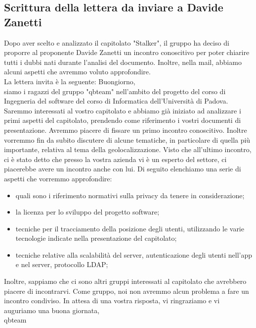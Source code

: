 \subsection{Scrittura della lettera da inviare a Davide Zanetti}
Dopo aver scelto e analizzato il capitolato "Stalker", il gruppo ha deciso di proporre al proponente Davide Zanetti un incontro conoscitivo per poter chiarire tutti i dubbi nati durante l'analisi del documento. Inoltre, nella mail, abbiamo alcuni aspetti che avremmo voluto approfondire.
\\La lettera invita è la seguente:
\bigskip
\newline
Buongiorno,
\\siamo i ragazzi del gruppo "qbteam" nell'ambito del progetto del corso di Ingegneria del software del corso di Informatica dell'Università di Padova. Saremmo interessati al vostro capitolato e abbiamo già iniziato ad analizzare i primi aspetti del capitolato, prendendo come riferimento i vostri documenti di presentazione. Avremmo piacere di fissare un primo incontro conoscitivo. Inoltre vorremmo fin da subito discutere di alcune tematiche, in particolare di quella più importante, relativa al tema della geolocalizzazione. Visto che all'ultimo incontro, ci è stato detto che presso la vostra azienda vi è un esperto del settore, ci piacerebbe avere un incontro anche con lui. Di seguito elenchiamo una serie di aspetti che vorremmo approfondire:
\begin{itemize}
	\item quali sono i riferimento normativi sulla privacy da tenere in considerazione;
	\item  la licenza per lo sviluppo del progetto software;
	\item tecniche per il tracciamento della posizione degli utenti, utilizzando le varie tecnologie indicate nella presentazione del capitolato;
	\item tecniche relative alla scalabilità del server, autenticazione degli utenti nell'app e nel server, protocollo LDAP;
\end{itemize}
Inoltre, sappiamo che ci sono altri gruppi interessati al capitolato che avrebbero piacere di incontrarvi. Come gruppo, noi non avremmo alcun problema a fare un incontro condiviso.
In attesa di una vostra risposta, vi ringraziamo e vi auguriamo una buona giornata,
\\qbteam

